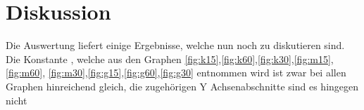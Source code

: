 
\section{Diskussion}
\label{sec:Diskussion}
Die Auswertung liefert einige Ergebnisse, welche nun noch zu diskutieren sind.
Die Konstante , welche aus den Graphen \ref{fig:k15},\ref{fig:k60},\ref{fig:k30},\ref{fig:m15},\ref{fig:m60},
\ref{fig:m30},\ref{fig:g15},\ref{fig:g60},\ref{fig:g30} entnommen wird ist zwar
bei allen Graphen hinreichend gleich, die zugehörigen Y Achsenabschnitte sind es hingegen nicht 
